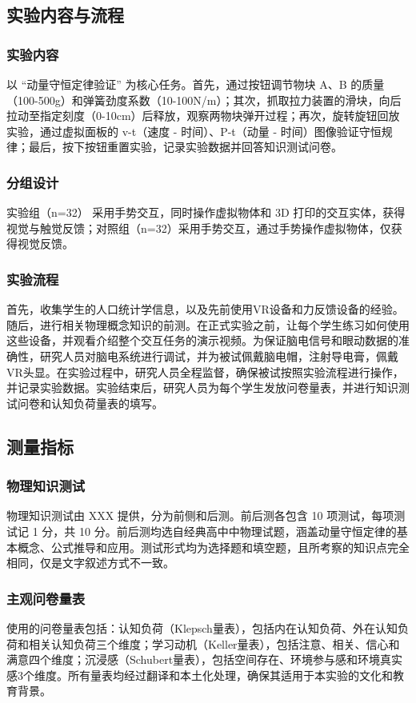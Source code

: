 \documentclass[runningheads]{llncs}
\begin{document}
\subsection{实验内容与流程}
\subsubsection{实验内容}
以 “动量守恒定律验证” 为核心任务。首先，通过按钮调节物块 A、B 的质量（100-500g）和弹簧劲度系数（10-100N/m）；其次，抓取拉力装置的滑块，向后拉动至指定刻度（0-10cm）后释放，观察两物块弹开过程；再次，旋转旋钮回放实验，通过虚拟面板的 v-t（速度 - 时间）、P-t（动量 - 时间）图像验证守恒规律；最后，按下按钮重置实验，记录实验数据并回答知识测试问卷。

\subsubsection{分组设计} 实验组（n=32） 采用手势交互，同时操作虚拟物体和 3D 打印的交互实体，获得视觉与触觉反馈；对照组（n=32）采用手势交互，通过手势操作虚拟物体，仅获得视觉反馈。

\subsubsection{实验流程}
首先，收集学生的人口统计学信息，以及先前使用VR设备和力反馈设备的经验。随后，进行相关物理概念知识的前测。在正式实验之前，让每个学生练习如何使用这些设备，并观看介绍整个交互任务的演示视频。为保证脑电信号和眼动数据的准确性，研究人员对脑电系统进行调试，并为被试佩戴脑电帽，注射导电膏，佩戴VR头显。在实验过程中，研究人员全程监督，确保被试按照实验流程进行操作，并记录实验数据。实验结束后，研究人员为每个学生发放问卷量表，并进行知识测试问卷和认知负荷量表的填写。

\subsection{测量指标}
\subsubsection{物理知识测试}
物理知识测试由 XXX 
提供，分为前侧和后测。前后测各包含 10 项测试，每项测试记 1 分，共 10 分。前后测均选自经典高中中物理试题，涵盖动量守恒定律的基本概念、公式推导和应用。测试形式均为选择题和填空题，且所考察的知识点完全相同，仅是文字叙述方式不一致。

\subsubsection{主观问卷量表}
使用的问卷量表包括：认知负荷（Klepsch量表）\cite{klepsch2017development}，包括内在认知负荷、外在认知负荷和相关认知负荷三个维度；学习动机（Keller量表）\cite{keller1983motivational}，包括注意、相关、信心和满意四个维度；沉浸感（Schubert量表）\cite{schubert2001experience}，包括空间存在、环境参与感和环境真实感3个维度。所有量表均经过翻译和本土化处理，确保其适用于本实验的文化和教育背景。
\end{document}
